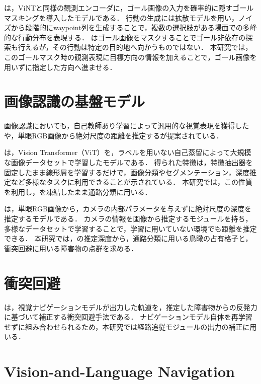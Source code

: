 \NoMaD は，ViNTと同様の観測エンコーダに，ゴール画像の入力を確率的に隠すゴールマスキングを導入したモデルである\cite{nomad}．
行動の生成には拡散モデル\cite{ddpm,diffusion_policy}を用い，ノイズから段階的にwaypoint列を生成することで，複数の選択肢がある場面での多峰的な行動分布を表現する．
\NoMaD はゴール画像をマスクすることでゴール非依存の探索も行えるが，その行動は特定の目的地へ向かうものではない．
本研究では，このゴールマスク時の観測表現に目標方向の情報を加えることで，ゴール画像を用いずに指定した方向へ進ませる．

\section{画像認識の基盤モデル}
\label{sec:related_vision}

画像認識においても，自己教師あり学習によって汎用的な視覚表現を獲得した\DINOvTwo \cite{dinov2}や，単眼RGB画像から絶対尺度の距離を推定する\UniDepth \cite{unidepth}が提案されている．

\DINOvTwo は，Vision Transformer（ViT）\cite{vit}を，ラベルを用いない自己蒸留によって大規模な画像データセットで学習したモデルである\cite{dinov2}．
得られた特徴は，特徴抽出器を固定したまま線形層を学習するだけで，画像分類やセグメンテーション，深度推定など多様なタスクに利用できることが示されている．
本研究では，この性質を利用し，\DINOvTwo を凍結したまま通路分類に用いる．

\UniDepth は，単眼RGB画像から，カメラの内部パラメータを与えずに絶対尺度の深度を推定するモデルである\cite{unidepth}．
カメラの情報を画像から推定するモジュールを持ち，多様なデータセットで学習することで，学習に用いていない環境でも距離を推定できる．
本研究では，\UniDepth の推定深度から，通路分類に用いる鳥瞰の占有格子と，衝突回避に用いる障害物の点群を求める．

\section{衝突回避}
\label{sec:related_care}

\CARE は，視覚ナビゲーションモデルが出力した軌道を，推定した障害物からの反発力に基づいて補正する衝突回避手法である\cite{care}．
ナビゲーションモデル自体を再学習せずに組み合わせられるため，本研究では経路追従モジュールの出力の補正に用いる．

\section{Vision-and-Language Navigation}
\label{sec:related_vln}

